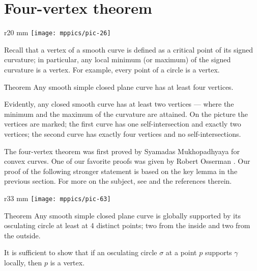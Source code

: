 \section{Four-vertex theorem}
{

\begin{wrapfigure}{r}{20 mm}
\vskip-8mm
\centering
\texttt{[image: mppics/pic-26]}
\vskip0mm
\end{wrapfigure}

Recall that a vertex of a smooth curve is defined as a critical point of its signed curvature;
in particular, any local minimum (or maximum) of the signed curvature is a vertex.
For example, every point of a circle is a vertex.

\begin{thm}{Тheorem}\label{thm:4-vert}
Any smooth simple closed plane curve has at least four vertices.
\end{thm}

}

Evidently, any closed smooth curve has at least two vertices --- where the minimum and the maximum of the curvature are attained.
On the picture the vertices are marked;
the first curve has one self-intersection and exactly two vertices;
the second curve has exactly four vertices and no self-intersections.

The four-vertex theorem was first proved by Syamadas Mukhopadhyaya \cite{mukhopadhyaya} for convex curves.
One of our favorite proofs was given by Robert Osserman \cite{osserman}.
Our proof of the following stronger statement is based on the key lemma in the previous section.
For more on the subject, see \cite{petrunin-zamora:moon} and the references therein.

{

\begin{wrapfigure}[8]{r}{33 mm}
\vskip-8mm
\centering
\texttt{[image: mppics/pic-63]}
\vskip0mm
\end{wrapfigure}

\begin{thm}{Theorem}\label{thm:4-vert-supporting}
Any smooth simple closed plane curve is globally supported by its osculating circle at least at 4 distinct points;
two from the inside and two from the outside.
\end{thm}

It is sufficient to show that if an osculating circle $\sigma$ at a point $p$ supports $\gamma$ locally, then $p$ is a vertex.

}

